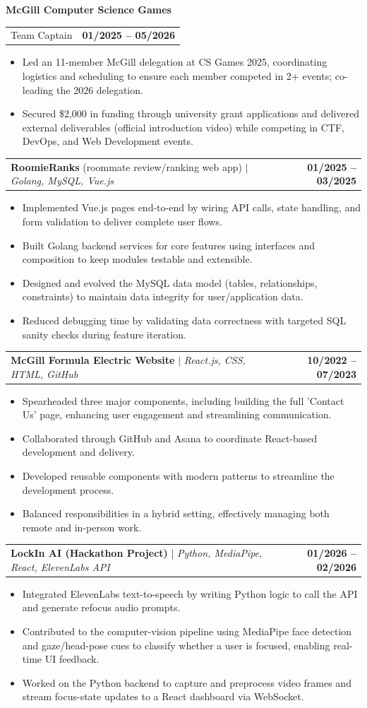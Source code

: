 \documentclass[letterpaper,11pt]{article}
\makeatletter
\newcommand{\resumeItemListStart}{%
  \begin{itemize}[topsep=2pt,itemsep=1pt,parsep=0pt,partopsep=0pt]
}
\newcommand{\resumeItemListEnd}{\end{itemize}\vspace{-8pt}}
\newcommand{\resumeItem}[1]{
  \item\small{{#1 \vspace{-2pt}}}
}
\newcommand{\resumeOrgHeading}[1]{
  \vspace{15pt} \item \textbf{#1}\vspace{-10pt}
}
\newcommand{\resumeProjectHeading}[2]{
    \item
    \begin{tabular*}{1.001\textwidth}{l@{\extracolsep{\fill}}r}
      \small#1 & \textbf{\small #2}\\
    \end{tabular*}
}
\makeatother
\begin{document}
\resumeOrgHeading{McGill Computer Science Games}

\resumeProjectHeading
  {Team Captain}
  {01/2025 -- 05/2026}
\resumeItemListStart
  \resumeItem{Led an 11-member McGill delegation at CS Games 2025, coordinating logistics and scheduling to ensure each member competed in 2+ events; co-leading the 2026 delegation.}
  \resumeItem{Secured \$2,000 in funding through university grant applications and delivered external deliverables (official introduction video) while competing in CTF, DevOps, and Web Development events.}
\resumeItemListEnd

\resumeProjectHeading
  {\textbf{RoomieRanks} (roommate review/ranking web app) $|$ \emph{Golang, MySQL, Vue.js}}
  {01/2025 -- 03/2025}
\resumeItemListStart
    \resumeItem{Implemented Vue.js pages end-to-end by wiring API calls, state handling, and form validation to deliver complete user flows.}
    \resumeItem{Built Golang backend services for core features using interfaces and composition to keep modules testable and extensible.}
    \resumeItem{Designed and evolved the MySQL data model (tables, relationships, constraints) to maintain data integrity for user/application data.}
    \resumeItem{Reduced debugging time by validating data correctness with targeted SQL sanity checks during feature iteration.}
\resumeItemListEnd

\resumeProjectHeading
  {\textbf{McGill Formula Electric Website} $|$ \emph{React.js, CSS, HTML, GitHub}}
  {10/2022 -- 07/2023}
\resumeItemListStart
  \resumeItem{Spearheaded three major components, including building the full 'Contact Us' page, enhancing user engagement and streamlining communication.}
  \resumeItem{Collaborated through GitHub and Asana to coordinate React-based development and delivery.}
  \resumeItem{Developed reusable components with modern patterns to streamline the development process.}
  \resumeItem{Balanced responsibilities in a hybrid setting, effectively managing both remote and in-person work.}
\resumeItemListEnd

\resumeProjectHeading
  {\textbf{LockIn AI (Hackathon Project)} $|$ \emph{Python, MediaPipe, React, ElevenLabs API}}
  {01/2026 -- 02/2026}
\resumeItemListStart
    \resumeItem{Integrated ElevenLabs text-to-speech by writing Python logic to call the API and generate refocus audio prompts.}
    \resumeItem{Contributed to the computer-vision pipeline using MediaPipe face detection and gaze/head-pose cues to classify whether a user is focused, enabling real-time UI feedback.}
    \resumeItem{Worked on the Python backend to capture and preprocess video frames and stream focus-state updates to a React dashboard via WebSocket.}
\resumeItemListEnd
\end{document}
